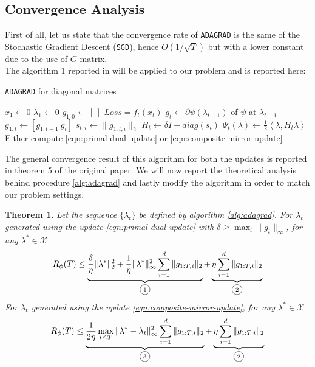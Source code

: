 \documentclass[notitlepage]{article}
\newcommand*\circled[1]{\tikz[baseline=(char.base)]{\node[shape=circle,draw,inner sep=2pt] (char) {#1};}}
\newtheorem{theorem}{Theorem}[section]
\begin{document}
\subsection{Convergence Analysis}
\label{sec:convergence}
First of all, let us state that the convergence rate of \texttt{ADAGRAD} is the same of the Stochastic Gradient Descent (\texttt{SGD}), hence $O(1/\sqrt{T})$ but with a lower constant due to the use of $G$ matrix.\\
The algorithm 1 reported in \cite{JMLR:v12:duchi11a} will be applied to our problem and is reported here:
\begin{algorithm}[H]
  \caption{\texttt{ADAGRAD} for diagonal matrices}
  \label{alg:adagrad}
  \begin{algorithmic}
      \State $x_1 \gets 0$
      \State $\lambda_1 \gets 0$
      \State $g_{1:0} \gets \left[\,\right]$
        \State $Loss = f_t(x_t)$
        \State $g_t \gets \partial \psi(\lambda_{t-1})$ of $\psi$ at $\lambda_{t-1}$
        \State $g_{1:t} \gets \left[ g_{1:t-1}\ g_t \right]$
        \State $s_{t,i} \gets \| g_{1:t,i} \|_2$
        \State $H_t \gets \delta \mathit{I} + diag(s_t)$
        \State $\Psi_t(\lambda) \gets \frac{1}{2} \left\langle \lambda,H_t \lambda \right\rangle$
        \State Either compute \eqref{eqn:primal-dual-update} or \eqref{eqn:composite-mirror-update} 
      \EndFor
    \EndFunction
  \end{algorithmic}  
\end{algorithm}
The general convergence result of this algorithm for both the updates is reported in theorem 5 of the original paper. We will now report the theoretical analysis behind procedure \ref{alg:adagrad} and lastly modify the algorithm in order to match our problem settings.
\begin{theorem}
  Let the sequence $\{\lambda_t\}$ be defined by algorithm \ref{alg:adagrad}. For $\lambda_t$ generated using the update \eqref{eqn:primal-dual-update} with $\delta \ge \max_t \|g_t\|_\infty$, for any $\lambda^* \in \mathcal{X}$
  \begin{equation} 
    R_\phi(T) \le \underbrace{\frac{\delta}{\eta} \|\lambda^*\|_2^2 + \frac{1}{\eta} \|\lambda^*\|_\infty^2 \sum_{i=1}^d \|g_{1:T,i}\|_2}_{\text{\circled{1}}} + \underbrace{\eta \sum_{i=1}^d \|g_{1:T,i}\|_2}_{\text{\circled{2}}} 
    \label{eqn:pd-regret}
  \end{equation}
  For $\lambda_t$ generated using the update \eqref{eqn:composite-mirror-update}, for any $\lambda^* \in \mathcal{X}$
  \begin{equation}
    R_\phi(T) \le \underbrace{\frac{1}{2\eta} \max_{t \le T} \|\lambda^* - \lambda_t\|_\infty^2 \sum_{i=1}^d \|g_{1:T,i}\|_2}_{\text{\circled{3}}} + \underbrace{\eta \sum_{i=1}^d \|g_{1:T,i}\|_2}_{\text{\circled{2}}} 
    \label{eqn:cm-regret}  
  \end{equation}
  \label{th:regrets}
\end{theorem}
\end{document}
